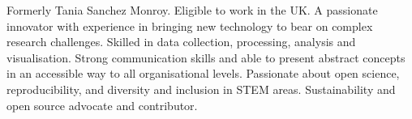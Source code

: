 

\begin{cvpubs}
  \cvpub
    {
      \begin{cvlist}
  \item {Formerly Tania Sanchez Monroy. Eligible to work
in the UK.
A passionate innovator with experience in bringing new technology to bear on
complex research challenges. Skilled in data collection, processing, analysis and visualisation.
Strong communication skills and able to present abstract
concepts in an accessible way to all organisational levels.
Passionate about open science, reproducibility, and diversity and inclusion in STEM areas. Sustainability and open source advocate and contributor.}
      \end{cvlist}
    }
\vspace{-11pt}
\end{cvpubs}